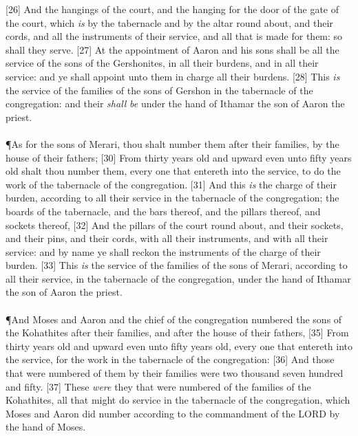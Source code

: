 [26] \textcolor[cmyk]{0.99998,1,0,0}{And the hangings of the court, and the hanging for the door of the gate of the court, which \emph{is} by the tabernacle and by the altar round about, and their cords, and all the instruments of their service, and all that is made for them: so shall they serve.}
[27] \textcolor[cmyk]{0.99998,1,0,0}{At the appointment of Aaron and his sons shall be all the service of the sons of the Gershonites, in all their burdens, and in all their service: and ye shall appoint unto them in charge all their burdens.}
[28] \textcolor[cmyk]{0.99998,1,0,0}{This \emph{is} the service of the families of the sons of Gershon in the tabernacle of the congregation: and their  \emph{shall} \emph{be} under the hand of Ithamar the son of Aaron the priest.}\\
\\
\P \textcolor[cmyk]{0.99998,1,0,0}{As for the sons of Merari, thou shalt number them after their families, by the house of their fathers;}
[30] \textcolor[cmyk]{0.99998,1,0,0}{From thirty years old and upward even unto fifty years old shalt thou number them, every one that entereth into the service, to do the work of the tabernacle of the congregation.}
[31] \textcolor[cmyk]{0.99998,1,0,0}{And this \emph{is} the charge of their burden, according to all their service in the tabernacle of the congregation; the boards of the tabernacle, and the bars thereof, and the pillars thereof, and sockets thereof,}
[32] \textcolor[cmyk]{0.99998,1,0,0}{And the pillars of the court round about, and their sockets, and their pins, and their cords, with all their instruments, and with all their service: and by name ye shall reckon the instruments of the charge of their burden.}
[33] \textcolor[cmyk]{0.99998,1,0,0}{This \emph{is} the service of the families of the sons of Merari, according to all their service, in the tabernacle of the congregation, under the hand of Ithamar the son of Aaron the priest.}\\
\\
\P \textcolor[cmyk]{0.99998,1,0,0}{And Moses and Aaron and the chief of the congregation numbered the sons of the Kohathites after their families, and after the house of their fathers,}
[35] \textcolor[cmyk]{0.99998,1,0,0}{From thirty years old and upward even unto fifty years old, every one that entereth into the service, for the work in the tabernacle of the congregation:}
[36] \textcolor[cmyk]{0.99998,1,0,0}{And those that were numbered of them by their families were two thousand seven hundred and fifty.}
[37] \textcolor[cmyk]{0.99998,1,0,0}{These \emph{were} they that were numbered of the families of the Kohathites, all that might do service in the tabernacle of the congregation, which Moses and Aaron did number according to the commandment of the LORD by the hand of Moses.}

